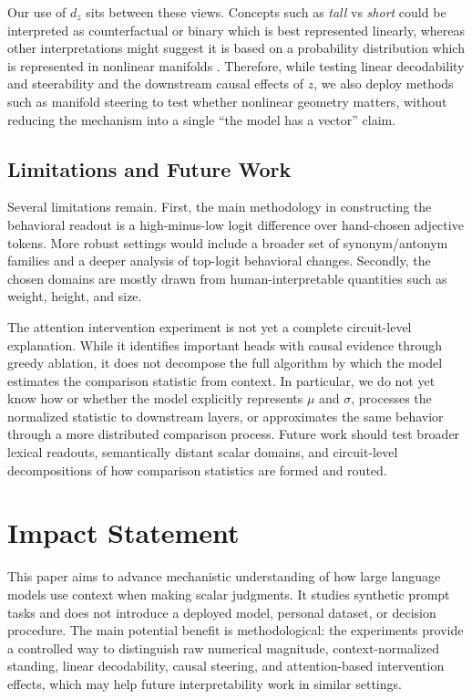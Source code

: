 \documentclass{article}
\newcommand{\primalz}{\ensuremath{d_{z}}}
\begin{document}
Our use of \primalz{} sits between these views. Concepts such as \emph{tall} vs \emph{short} could be interpreted as counterfactual or binary which is best represented linearly, whereas other interpretations might suggest it is based on a probability distribution which is represented in nonlinear manifolds \citep{sarfati2026beliefs, park2026softmaxgeometry}. Therefore, while testing linear decodability and steerability and the downstream causal effects of $z$, we also deploy methods such as manifold steering to test whether nonlinear geometry matters, without reducing the mechanism into a single ``the model has a vector'' claim.

\subsection{Limitations and Future Work}

Several limitations remain. First, the main methodology in constructing the behavioral readout is a high-minus-low logit difference over hand-chosen adjective tokens.
More robust settings would include a broader set of synonym/antonym families and a deeper analysis of top-logit behavioral changes.
Secondly, the chosen domains are mostly drawn from human-interpretable quantities such as weight, height, and size.


The attention intervention experiment is not yet a complete circuit-level explanation.
While it identifies important heads with causal evidence through greedy ablation, it does not decompose the full algorithm by which the model estimates the comparison statistic from context.
In particular, we do not yet know how or whether the model explicitly represents $\mu$ and $\sigma$, processes the normalized statistic to downstream layers, or approximates the same behavior through a more distributed comparison process.
Future work should test broader lexical readouts, semantically distant scalar domains, and circuit-level decompositions of how comparison statistics are formed and routed.


\section*{Impact Statement}

This paper aims to advance mechanistic understanding of how large language models use context when making scalar judgments.
It studies synthetic prompt tasks and does not introduce a deployed model, personal dataset, or decision procedure.
The main potential benefit is methodological: the experiments provide a controlled way to distinguish raw numerical magnitude, context-normalized standing, linear decodability, causal steering, and attention-based intervention effects, which may help future interpretability work in similar settings.
\end{document}
